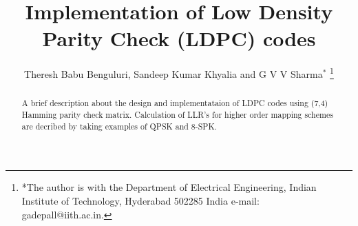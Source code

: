 \documentclass[journal,12pt,twocolumn]{IEEEtran}
\renewcommand\thesection{\arabic{section}}
\begin{document}
\let\StandardTheFigure\thefigure




\let\StandardTheFigure\thefigure
\let\StandardTheTable\thetable





\def\putbox#1#2#3{\makebox[0in][l]{\makebox[#1][l]{}\raisebox{\baselineskip}[0in][0in]{\raisebox{#2}[0in][0in]{#3}}}}
     \def\rightbox#1{\makebox[0in][r]{#1}}
     \def\centbox#1{\makebox[0in]{#1}}
     \def\topbox#1{\raisebox{-\baselineskip}[0in][0in]{#1}}
     \def\midbox#1{\raisebox{-0.5\baselineskip}[0in][0in]{#1}}




\title{ 
Implementation of Low Density Parity Check (LDPC) codes
}



\author{Theresh Babu Benguluri, Sandeep Kumar Khyalia and G V V Sharma$^{*}$%
\thanks{*The author is with the Department
of Electrical Engineering, Indian Institute of Technology, Hyderabad
502285 India e-mail:  gadepall@iith.ac.in.}
}


\maketitle

\tableofcontents

%
\begin{abstract}
\boldmath
A brief description about the design and implementataion of LDPC codes using (7,4) Hamming parity check matrix. Calculation of LLR's for higher order mapping schemes are decribed by taking examples of QPSK and 8-SPK.
\end{abstract}


\end{document}
